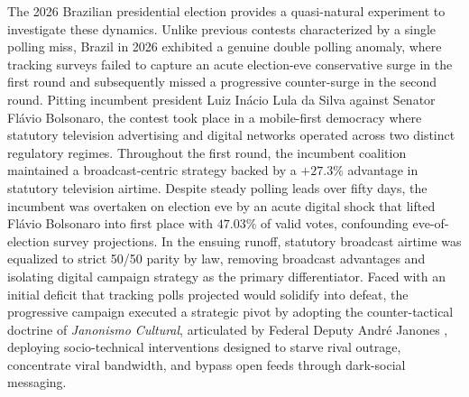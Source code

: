 \documentclass[a4paper,fleqn]{cas-dc}
\begin{document}
The 2026 Brazilian presidential election provides a quasi-natural experiment to investigate these dynamics. Unlike previous contests characterized by a single polling miss, Brazil in 2026 exhibited a genuine double polling anomaly, where tracking surveys failed to capture an acute election-eve conservative surge in the first round and subsequently missed a progressive counter-surge in the second round. Pitting incumbent president Luiz Inácio Lula da Silva against Senator Flávio Bolsonaro, the contest took place in a mobile-first democracy where statutory television advertising and digital networks operated across two distinct regulatory regimes. Throughout the first round, the incumbent coalition maintained a broadcast-centric strategy backed by a $+27.3\%$ advantage in statutory television airtime. Despite steady polling leads over fifty days, the incumbent was overtaken on election eve by an acute digital shock that lifted Flávio Bolsonaro into first place with $47.03\%$ of valid votes, confounding eve-of-election survey projections. In the ensuing runoff, statutory broadcast airtime was equalized to strict 50/50 parity by law, removing broadcast advantages and isolating digital campaign strategy as the primary differentiator. Faced with an initial deficit that tracking polls projected would solidify into defeat, the progressive campaign executed a strategic pivot by adopting the counter-tactical doctrine of \emph{Janonismo Cultural}, articulated by Federal Deputy André Janones \citep{janones2023janonismo}, deploying socio-technical interventions designed to starve rival outrage, concentrate viral bandwidth, and bypass open feeds through dark-social messaging.
\end{document}
